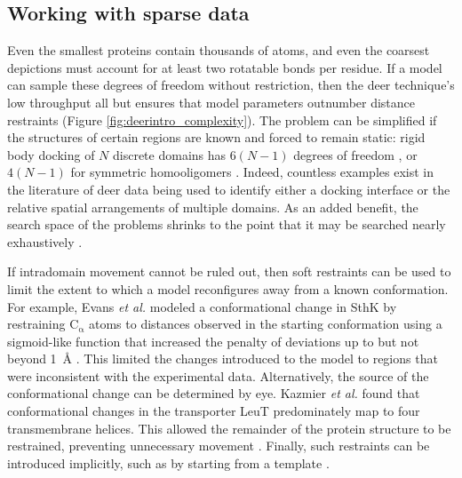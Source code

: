 
\subsection{Working with sparse data}

Even the smallest proteins contain thousands of atoms, and even the coarsest depictions must account for at least two rotatable bonds per residue. If a model can sample these degrees of freedom without restriction, then the \gls{deer} technique's low throughput all but ensures that model parameters outnumber distance restraints (Figure \ref{fig:deerintro_complexity}). The problem can be simplified if the structures of certain regions are known and forced to remain static: rigid body docking of $N$ discrete domains has $6(N-1)$ degrees of freedom \citep*{Duss2015}, or $4(N-1)$ for symmetric homooligomers \citep*{Hilger2007}. Indeed, countless examples exist in the literature of \gls{deer} data being used to identify either a docking interface or the relative spatial arrangements of multiple domains. As an added benefit, the search space of the problems shrinks to the point that it may be searched nearly exhaustively \citep*{Alonso-Garcia2015, Kim2011, Sundaramoorthy2017}.

If intradomain movement cannot be ruled out, then soft restraints can be used to limit the extent to which a model reconfigures away from a known conformation. For example, Evans \emph{et al.} modeled a conformational change in SthK by restraining $\mathrm{C_{\upalpha}}$ atoms to distances observed in the starting conformation using a sigmoid-like function that increased the penalty of deviations up to but not beyond \SI{1}{\angstrom} \citep*{Evans2020}. This limited the changes introduced to the model to regions that were inconsistent with the experimental data. Alternatively, the source of the conformational change can be determined by eye. Kazmier \emph{et al.} found that conformational changes in the transporter LeuT predominately map to four transmembrane helices. This allowed the remainder of the protein structure to be restrained, preventing unnecessary movement \citep*{Kazmier2014a}. Finally, such restraints can be introduced implicitly, such as by starting from a template \citep*{Binder2019, Evans2020}.

